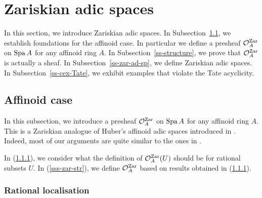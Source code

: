 


\section{Zariskian adic spaces}

In this section, we introduce Zariskian adic spaces. 
In Subsection~\ref{ss-affinoid}, 
we establish foundations for the affinoid case. 
In particular we define a presheaf $\mathcal{O}_A^{{\operatorname{Zar}}}$ on ${\operatorname{Spa}}\,A$ 
for any affinoid ring $A$. 
In Subsection~\ref{ss-structure}, 
we prove that $\mathcal{O}_A^{{\operatorname{Zar}}}$ is actually a sheaf. 
In Subsection~\ref{ss-zar-ad-sp}, 
we define Zariskian adic spaces. 
In Subsection~\ref{ss-cex-Tate}, 
we exhibit examples that violate the Tate acyclicity. 

\subsection{Affinoid case}\label{ss-affinoid}

In this subsection, we introduce a presheaf $\mathcal{O}_A^{{\operatorname{Zar}}}$ on ${\operatorname{Spa}}\,A$ 
for any affinoid ring $A$. 
This is a Zariskian analogue of Huber's affinoid adic spaces 
introduced in \cite[Section 1]{Hub94}. 
Indeed, most of our arguments are quite similar 
to the ones in \cite[Section 1]{Hub94}. 

In (\ref{sss-rat-localise}), we consider 
what the definition of $\mathcal{O}_A^{{\operatorname{Zar}}}(U)$ should be for rational subsets $U$. 
In (\ref{sss-zar-str}), we define $\mathcal{O}_A^{{\operatorname{Zar}}}$  
based on results obtained in (\ref{sss-rat-localise}). 


\subsubsection{Rational localisation}\label{sss-rat-localise}



